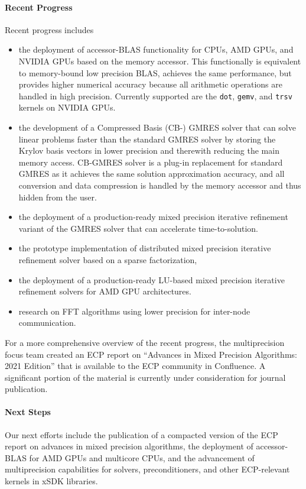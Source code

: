 \paragraph{Recent Progress}
Recent progress includes
\begin{itemize}
\item the deployment of accessor-BLAS functionality for CPUs, AMD GPUs, and NVIDIA GPUs based on the memory accessor. This functionally is equivalent to memory-bound low precision BLAS, achieves the same performance, but provides higher numerical accuracy because all arithmetic operations are handled in high precision. Currently supported are the \texttt{dot}, \texttt{gemv}, and \texttt{trsv} kernels on NVIDIA GPUs.
\item the development of a Compressed Basis (CB-) GMRES solver that can solve linear problems faster than the standard GMRES solver by storing the Krylov basis vectors in lower precision and therewith reducing the main memory access. CB-GMRES solver is a plug-in replacement for standard GMRES as it achieves the same solution approximation accuracy, and all conversion and data compression is handled by the memory accessor and thus hidden from the user.
\item the deployment of a production-ready mixed precision iterative refinement variant of the GMRES solver that can accelerate time-to-solution.
\item the prototype implementation of distributed mixed precision iterative refinement solver based on a sparse factorization,
\item the deployment of a production-ready LU-based mixed precision iterative refinement solvers for AMD GPU architectures.
\item research on FFT algorithms using lower precision for inter-node communication. 
\end{itemize}


For a more comprehensive overview of the recent progress, the multiprecision focus team created an ECP report on ``Advances in Mixed Precision Algorithms: 2021 Edition'' that is available to the ECP community in Confluence. A significant portion of the material is currently under consideration for journal publication.


\paragraph{Next Steps}

Our next efforts include the publication of a compacted version of the ECP report on advances in mixed precision algorithms, the deployment of accessor-BLAS for AMD GPUs and multicore CPUs,  and the advancement of multiprecision capabilities for solvers, preconditioners, and other ECP-relevant kernels in xSDK libraries.

